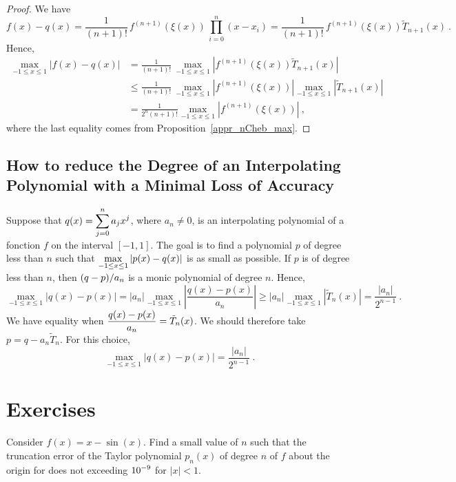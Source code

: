 \begin{proof}
We have
\[
f(x) - q(x) = \frac{1}{(n+1)!}\, f^{(n+1)}(\xi(x)) \,
\prod_{i=0}^n (x-x_i) = \frac{1}{(n+1)!}\, f^{(n+1)}(\xi(x))
\tilde{T}_{n+1}(x) \  .
\]
Hence,
\begin{align*}
\max_{-1\leq x \leq 1} \left| f(x) - q(x) \right| &= \frac{1}{(n+1)!}\, 
\max_{-1\leq x \leq 1} \left| f^{(n+1)}(\xi(x)) \tilde{T}_{n+1}(x) \right| \\
&\leq \frac{1}{(n+1)!}\, \max_{-1\leq x \leq 1} \left| f^{(n+1)}(\xi(x))\right|
\max_{-1\leq x \leq 1} \left| \tilde{T}_{n+1}(x) \right| \\
&= \frac{1}{2^n(n+1)!} \max_{-1\leq x \leq 1} \left| f^{(n+1)}(\xi(x))\right|
\ ,
\end{align*}
where the last equality comes from Proposition~\ref{appr_nCheb_max}.
\end{proof}

\subsection{How to reduce the Degree of an Interpolating
Polynomial with a  Minimal Loss of Accuracy} \label{bestInterPol}

Suppose that $\displaystyle q(x) = \sum_{j=0}^n a_j x^j$, where
$a_n \neq 0$, is an interpolating polynomial of a fonction $f$ on the
interval $[-1,1]$.  The goal is to find a polynomial $p$ of degree less than
$n$ such that
$\displaystyle \max_{-1\leq x \leq 1} \left| p(x) - q(x) \right|$ is as small
as possible.  If $p$ is of degree less than $n$, then
$\displaystyle (q-p)/a_n$ is a monic polynomial of degree $n$.  Hence,
\[
\max_{-1\leq x \leq 1} \left| q(x)-p(x)\right| =
|a_n| \max_{-1\leq x \leq 1} \left| \frac{q(x)-p(x)}{a_n} \right|
\geq |a_n| \max_{-1\leq x \leq 1} \left| \tilde{T}_n(x) \right|
= \frac{|a_n|}{2^{n-1}} \ .
\]
We have equality when
$\displaystyle \frac{q(x)-p(x)}{a_n} = \tilde{T}_n(x)$.  We should
therefore take $p = q - a_n \tilde{T}_n$.  For this choice,
\[
\max_{-1\leq x \leq 1} \left| q(x)-p(x)\right| = \frac{|a_n|}{2^{n-1}} \ .
\]

\section{Exercises}

\begin{question}
Consider $f(x) = x -\sin(x)$.  Find a small value of $n$ such that the
truncation error of the Taylor polynomial $p_n(x)$ of degree $n$ of
$f$ about the origin for does not exceeding $\displaystyle 10^{-9}$ for $|x|<1$.
\end{question}

